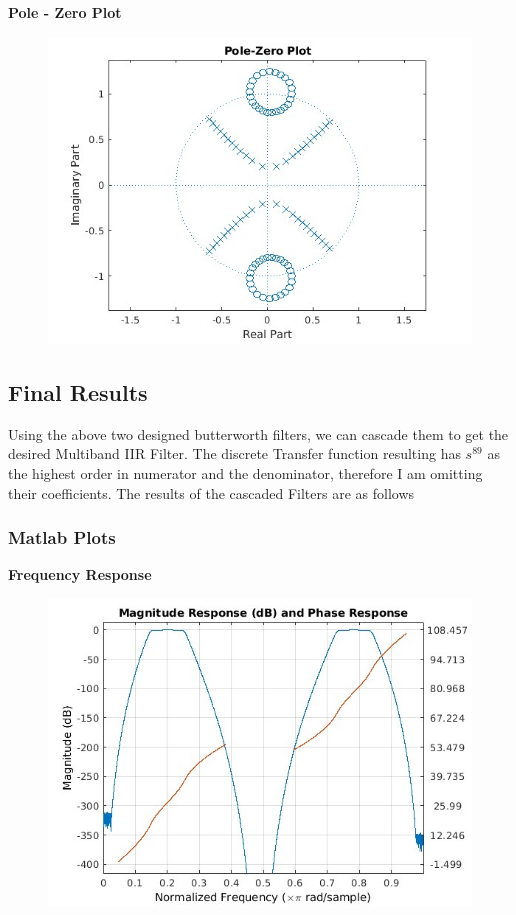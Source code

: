 \documentclass{article}
\begin{document}
\textbf{Pole - Zero Plot}
\begin{figure}[H]
\hspace*{-2.5cm}
    \centering
    \includegraphics[scale = 0.5]{pole_zeroplot_bsf.jpg}
    \label{fig:my_label}
\end{figure}

\subsection{Final Results}
Using the above two designed butterworth filters, we can cascade them to get the desired Multiband IIR Filter. The discrete Transfer function resulting has $s^{89}$ as the highest order in numerator and the denominator, therefore I am omitting their coefficients. The results of the cascaded Filters are as follows
\subsubsection{Matlab Plots}
\textbf{Frequency Response}
\begin{figure}[H]
\hspace*{-2.5cm}
    \centering
    \includegraphics[scale = 0.7]{Freq_resp_final.jpg}
    \label{fig:my_label}
\end{figure}
\end{document}
